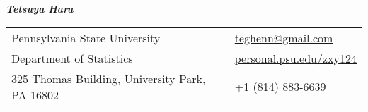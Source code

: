 \documentclass[utf8,letterpaper,oneside]{article}
\begin{document}
\noindent  \textit{\textbf{Tetsuya Hara}}%
\small
\begin{center}
 \begin{tabular}{l l}
  Pennsylvania State University                  & \hspace{1in} \href{mailto:teghenn@gmail.com}{teghenn@gmail.com}                \\
  Department of Statistics                       & \hspace{1in}   \href{http://personal.psu.edu/zxy124/}{personal.psu.edu/zxy124} \\
  325 Thomas Building, University Park, PA 16802 & \hspace{1in}+1 (814) 883-6639                                                  \\
 \end{tabular}
\end{center}
\noindent
\end{document}
